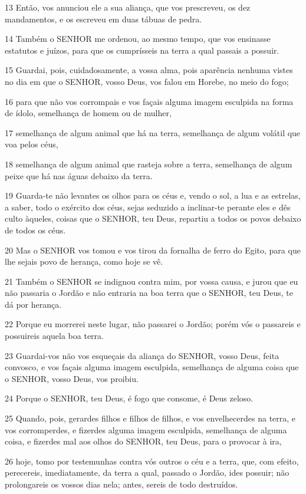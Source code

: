 \par 13 Então, vos anunciou ele a sua aliança, que vos prescreveu, os dez mandamentos, e os escreveu em duas tábuas de pedra.
\par 14 Também o SENHOR me ordenou, ao mesmo tempo, que vos ensinasse estatutos e juízos, para que os cumprísseis na terra a qual passais a possuir.
\par 15 Guardai, pois, cuidadosamente, a vossa alma, pois aparência nenhuma vistes no dia em que o SENHOR, vosso Deus, vos falou em Horebe, no meio do fogo;
\par 16 para que não vos corrompais e vos façais alguma imagem esculpida na forma de ídolo, semelhança de homem ou de mulher,
\par 17 semelhança de algum animal que há na terra, semelhança de algum volátil que voa pelos céus,
\par 18 semelhança de algum animal que rasteja sobre a terra, semelhança de algum peixe que há nas águas debaixo da terra.
\par 19 Guarda-te não levantes os olhos para os céus e, vendo o sol, a lua e as estrelas, a saber, todo o exército dos céus, sejas seduzido a inclinar-te perante eles e dês culto àqueles, coisas que o SENHOR, teu Deus, repartiu a todos os povos debaixo de todos os céus.
\par 20 Mas o SENHOR vos tomou e vos tirou da fornalha de ferro do Egito, para que lhe sejais povo de herança, como hoje se vê.
\par 21 Também o SENHOR se indignou contra mim, por vossa causa, e jurou que eu não passaria o Jordão e não entraria na boa terra que o SENHOR, teu Deus, te dá por herança.
\par 22 Porque eu morrerei neste lugar, não passarei o Jordão; porém vós o passareis e possuireis aquela boa terra.
\par 23 Guardai-vos não vos esqueçais da aliança do SENHOR, vosso Deus, feita convosco, e vos façais alguma imagem esculpida, semelhança de alguma coisa que o SENHOR, vosso Deus, vos proibiu.
\par 24 Porque o SENHOR, teu Deus, é fogo que consome, é Deus zeloso.
\par 25 Quando, pois, gerardes filhos e filhos de filhos, e vos envelhecerdes na terra, e vos corromperdes, e fizerdes alguma imagem esculpida, semelhança de alguma coisa, e fizerdes mal aos olhos do SENHOR, teu Deus, para o provocar à ira,
\par 26 hoje, tomo por testemunhas contra vós outros o céu e a terra, que, com efeito, perecereis, imediatamente, da terra a qual, passado o Jordão, ides possuir; não prolongareis os vossos dias nela; antes, sereis de todo destruídos.
